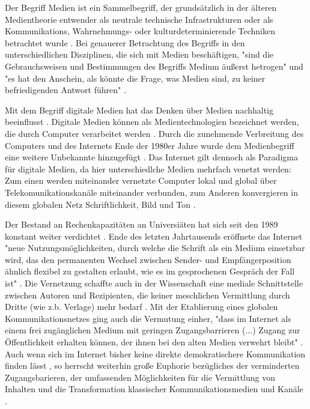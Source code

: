 Der Begriff Medien ist ein Sammelbegriff, der grundsätzlich in der älteren Medientheorie entwender als neutrale technische Infrastrukturen oder als Kommunikations, Wahrnehmungs- oder kulturdeterminierende Techniken betrachtet wurde \cite{beck2005_Kommunikation}. Bei genauerer Betrachtung des Begriffs in den unterschiedlichen Disziplinen, die sich mit Medien beschäftigen, "sind die Gebrauchsweisen und Bestimmungen des Begriffs Medium äußerst hetrogen" und "es hat den Anschein, als könnte die Frage, was Medien sind, zu keiner befriedigenden Antwort führen" \cite{Burkhardt_2015}.

Mit dem Begriff digitale Medien hat das Denken über Medien nachhaltig beeinflusst  \cite{Burkhardt_2015}. Digitale Medien können als Medientechnologien bezeichnet werden, die durch Computer verarbeitet werden \cite{nunning_2013_metzler}. Durch die zunehmende Verbreitung des Computers und des Internets Ende der 1980er Jahre wurde dem Medienbegriff eine weitere Unbekannte hinzugefügt \cite{Burkhardt_2015}. Das Internet gilt dennoch als Paradigma für digitale Medien, da hier unterschiedlche Medien mehrfach venetzt werden: Zum einen werden miteinander vernetzte Computer lokal und global über Telekomunikationskanäle miteinander verbunden, zum Anderen konvergieren in diesem globalen Netz Schriftlichkeit, Bild und Ton \cite{nunning_2013_metzler}.

Der Bestand an Rechenkapazitäten an Universiäten hat sich seit den 1989 konstant weiter verdichtet \cite{Rutenfranz_1997}. Ende des letzten Jahrtausends eröffnete das Internet "neue Nutzungsmöglichkeiten, durch welche die Schrift als ein Medium einsetzbar wird, das den permanenten Wechsel zwischen Sender- und Empfängerposition ähnlich flexibel zu gestalten erlaubt, wie es im gesprochenen Gespräch der Fall ist" \cite{sandbothe_2000_pragmatische}. Die Vernetzung schaffte auch in der Wissenschaft eine mediale Schnittstelle zwischen Autoren und Rezipienten, die keiner meschlichen Vermittlung durch Dritte (wie z.b. Verlage) mehr bedarf \cite{naeder_2010_open}. Mit der Etablierung eines globalen Kommunikationsnetzes ging auch die Vermutung einher, "dass im Internet als einem frei zugänglichen Medium mit geringen Zugangsbarrieren (...) Zugang zur Öffentlichkeit erhalten können, der ihnen bei den alten Medien verwehrt bleibt" \cite{Gerhards_2007}. Auch wenn sich im Internet bisher keine direkte demokratischere Kommunikation finden lässt \cite{Gerhards_2007}, so herrscht weiterhin große Euphorie bezügliches der verminderten Zugangsbarieren, der umfassenden Möglichkeiten für die Vermittlung von Inhalten und die Transformation klassischer Kommunikationsmedien und Kanäle \cite{suchen}.

